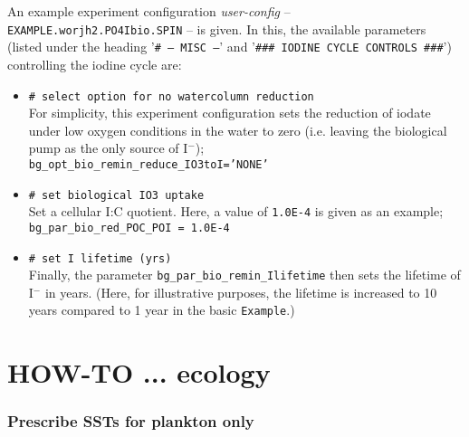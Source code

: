 \documentclass[11pt,fleqn]{book} %
\begin{document}
An example experiment configuration \textit{user-config} -- \texttt{EXAMPLE.worjh2.PO4Ibio.SPIN} -- is given. In this, the available parameters (listed under the heading '\texttt{\# --- MISC ---}' and '\texttt{\#\#\# IODINE CYCLE CONTROLS \#\#\#}') controlling the iodine cycle are:

\begin{itemize}[noitemsep]

\vspace{1mm}
        \item \texttt{\# select option for no watercolumn reduction}
        \\ For simplicity, this experiment configuration sets the reduction of iodate under low oxygen conditions in the water to zero (i.e. leaving the biological pump as the only source of I\(^{-}\));
\\ \texttt{bg\_opt\_bio\_remin\_reduce\_IO3toI='NONE'}

\vspace{1mm}
        \item \texttt{\# set biological IO3 uptake}
        \\ Set a cellular I:C quotient. Here, a value of \texttt{1.0E-4} is given as an example;
\\ \texttt{bg\_par\_bio\_red\_POC\_POI = 1.0E-4}

\vspace{1mm}
        \item \texttt{\# set I lifetime (yrs)}
        \\ Finally, the parameter \texttt{bg\_par\_bio\_remin\_Ilifetime} then sets the lifetime of I\(^{-}\) in years. (Here, for illustrative purposes, the lifetime is increased to 10 years compared to 1 year in the basic \texttt{Example}.)

\end{itemize}
\vspace{1mm}


\newpage


\section{HOW-TO ...  ecology}

%
\subsubsection{Prescribe SSTs for plankton only}
\vspace{1mm}
\end{document}
